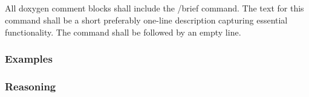 \subsection*{\doxygenRule{}}

All doxygen comment blocks shall include the /brief command. The text for this command shall be a short preferably one-line description capturing essential functionality. The command shall be followed by an empty line.

\subsubsection*{Examples}

\noindent
\begin{minipage}[t]{0.47\textwidth}
    
\end{minipage}\hfill
\begin{minipage}[t]{0.47\textwidth}
    
\end{minipage}

\noindent
\begin{minipage}[t]{0.47\textwidth}
    
\end{minipage}\hfill

\noindent
\begin{minipage}[t]{0.47\textwidth}
    
\end{minipage}\hfill

\subsubsection*{Reasoning}

